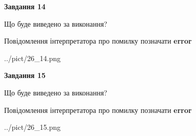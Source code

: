 \documentclass[11pt, ukrainian]{article}
\begin{document}
{\begin {large}
{\begin {center}\textbf{Завдання 14}\end {center}}\par
Що буде виведено за виконання? \par
Повідомлення інтерпретатора про помилку позначати \textbf{error}

\begin{center}
	{../pict/26_14.png}
\end{center}
\newpage

{\begin {center}\textbf{Завдання 15}\end {center}}\par
Що буде виведено за виконання? \par
Повідомлення інтерпретатора про помилку позначати \textbf{error}

\begin{center}
	{../pict/26_15.png}
\end{center}
\newpage

\end {large}}
\end{document}
